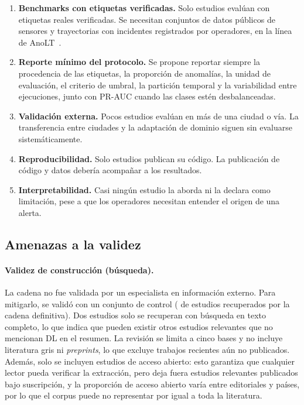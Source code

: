 \documentclass[12pt, a4paper]{article}
\begin{document}
\begin{enumerate}[label=(\arabic*)]
  \item \textbf{Benchmarks con etiquetas verificadas.} Solo \NetiqVerificadas{} estudios eval\'{u}an con etiquetas reales verificadas. Se necesitan conjuntos de datos p\'{u}blicos de sensores y trayectorias con incidentes registrados por operadores, en la l\'{i}nea de AnoLT~\cite{taheri2026applicability}.
  \item \textbf{Reporte m\'{i}nimo del protocolo.} Se propone reportar siempre la procedencia de las etiquetas, la proporci\'{o}n de anomal\'{i}as, la unidad de evaluaci\'{o}n, el criterio de umbral, la partici\'{o}n temporal y la variabilidad entre ejecuciones, junto con PR-AUC cuando las clases est\'{e}n desbalanceadas.
  \item \textbf{Validaci\'{o}n externa.} Pocos estudios eval\'{u}an en m\'{a}s de una ciudad o v\'{i}a. La transferencia entre ciudades y la adaptaci\'{o}n de dominio siguen sin evaluarse sistem\'{a}ticamente.
  \item \textbf{Reproducibilidad.} Solo \NcodigoURL{} estudios publican su c\'{o}digo. La publicaci\'{o}n de c\'{o}digo y datos deber\'{i}a acompa\~{n}ar a los resultados.
  \item \textbf{Interpretabilidad.} Casi ning\'{u}n estudio la aborda ni la declara como limitaci\'{o}n, pese a que los operadores necesitan entender el origen de una alerta.
\end{enumerate}

\subsection{Amenazas a la validez}
\label{sec:amenazas}

\paragraph{Validez de construcci\'{o}n (b\'{u}squeda).} La cadena no fue validada por un especialista en informaci\'{o}n externo. Para mitigarlo, se valid\'{o} con un conjunto de control (\NsensibOK{} de \Nestudios{} estudios recuperados por la cadena definitiva). Dos estudios solo se recuperan con b\'{u}squeda en texto completo, lo que indica que pueden existir otros estudios relevantes que no mencionan DL en el resumen. La revisi\'{o}n se limita a cinco bases y no incluye literatura gris ni \textit{preprints}, lo que excluye trabajos recientes a\'{u}n no publicados. Adem\'{a}s, solo se incluyen estudios de acceso abierto: esto garantiza que cualquier lector pueda verificar la extracci\'{o}n, pero deja fuera estudios relevantes publicados bajo suscripci\'{o}n, y la proporci\'{o}n de acceso abierto var\'{i}a entre editoriales y pa\'{i}ses, por lo que el corpus puede no representar por igual a toda la literatura.
\end{document}
